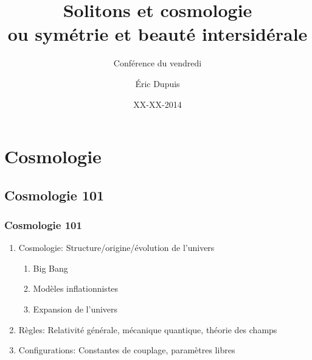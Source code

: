 \documentclass[handout]{beamer}
\title{Solitons et cosmologie\\ ou symétrie et beauté intersidérale}
\subtitle{Conférence du vendredi}
\author{Éric Dupuis}
\institute{Université de Montréal, département de physique des particules}
\date{XX-XX-2014}
\begin{document}
\begin{frame}
\titlepage
\end{frame}
%

\section*{}
\begin{frame}
\tableofcontents
\end{frame}



\section{Cosmologie}
\subsection{Cosmologie 101}
\begin{frame}
\frametitle{Cosmologie 101}
\begin{enumerate}
\item Cosmologie: Structure/origine/évolution de l'univers
\begin{enumerate}
\item Big Bang
\item Modèles inflationnistes
\item Expansion de l'univers
\end{enumerate}
\item Règles: Relativité générale, mécanique quantique, théorie des champs
\item Configurations: Constantes de couplage, paramètres libres
\end{enumerate}
\end{frame}
\end{document}

